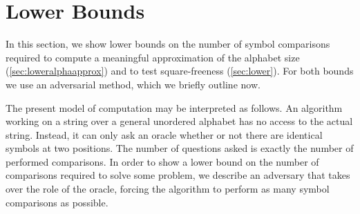 \section{Lower Bounds}
\label{sec:lowerbounds}

In this section, we show lower bounds on the number of symbol comparisons required to compute a meaningful approximation of the alphabet size (\cref{sec:loweralphaapprox}) and to test square-freeness (\cref{sec:lower}).
For both bounds we use an adversarial method, which we briefly outline now.

The present model of computation may be interpreted as follows. 
An algorithm working on a string over a general unordered alphabet has no access to the actual string. 
Instead, it can only ask an oracle whether or not there are identical symbols at two positions. 
The number of questions asked is exactly the number of performed comparisons.
In order to show a lower bound on the number of comparisons required to solve some problem, we describe an adversary that takes over the role of the oracle, forcing the algorithm to perform as many symbol comparisons as possible.



\iffalse
Particularly, in \cref{sec:loweralphaapprox}, the adversary keeps the answers consistent with strings of vastly different alphabet sizes. As long as the algorithm performs fewer than $\frac{ns} 4$ comparisons, the adversary can guarantee that its answers are consistent with strings whose alphabet sizes vary by a factor of $\Omega(n)$. Thus, estimating the alphabet size up to a factor of $o(n)$ takes $\Omega(ns)$ comparisons.
In \cref{sec:lower}, the adversary keeps the answers consistent with at least one string that does contain a square, and at least one string that does not. It takes $\Omega(n\lg s)$ comparisons until the adversary has to definitively decide whether the string is square-free or not. Thus testing square-freeness takes $\Omega(n \lg s)$ comparisons.
\fi

\newcommand{\yesedges}{E_\textnormal{yes}}
\newcommand{\noedges}{E_\textnormal{no}}
\newcommand{\nodecol}[1]{\gamma(#1)}

